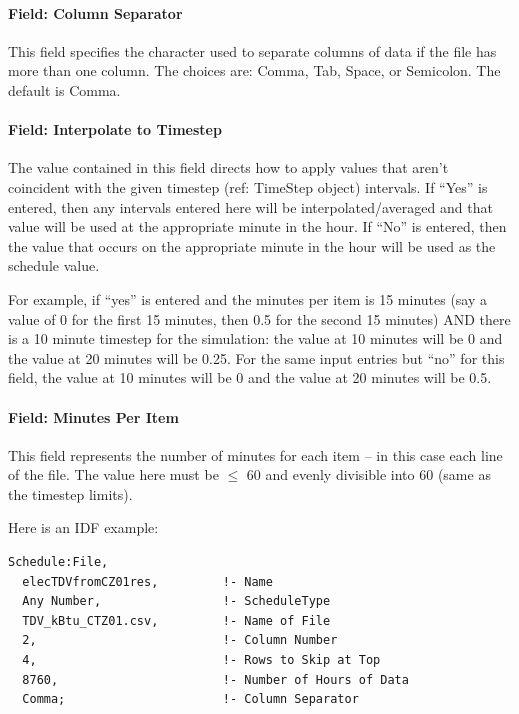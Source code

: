 \paragraph{Field: Column Separator}\label{field-column-separator-001}

This field specifies the character used to separate columns of data if the file has more than one column. The choices are: Comma, Tab, Space, or Semicolon. The default is Comma.

\paragraph{Field: Interpolate to Timestep}\label{field-interpolate-to-timestep-2}

The value contained in this field directs how to apply values that aren't coincident with the given timestep (ref: TimeStep object) intervals. If ``Yes'' is entered, then any intervals entered here will be interpolated/averaged and that value will be used at the appropriate minute in the hour. If ``No'' is entered, then the value that occurs on the appropriate minute in the hour will be used as the schedule value.

For example, if ``yes'' is entered and the minutes per item is 15 minutes (say a value of 0 for the first 15 minutes, then 0.5 for the second 15 minutes) AND there is a 10 minute timestep for the simulation: the value at 10 minutes will be 0 and the value at 20 minutes will be 0.25. For the same input entries but ``no'' for this field, the value at 10 minutes will be 0 and the value at 20 minutes will be 0.5.

\paragraph{Field: Minutes Per Item}\label{field-minutes-per-item-1}

This field represents the number of minutes for each item -- in this case each line of the file. The value here must be \(\le\) 60 and evenly divisible into 60 (same as the timestep limits).

Here is an IDF example:

\begin{lstlisting}
Schedule:File,
  elecTDVfromCZ01res,         !- Name
  Any Number,                 !- ScheduleType
  TDV_kBtu_CTZ01.csv,         !- Name of File
  2,                          !- Column Number
  4,                          !- Rows to Skip at Top
  8760,                       !- Number of Hours of Data
  Comma;                      !- Column Separator
\end{lstlisting}

